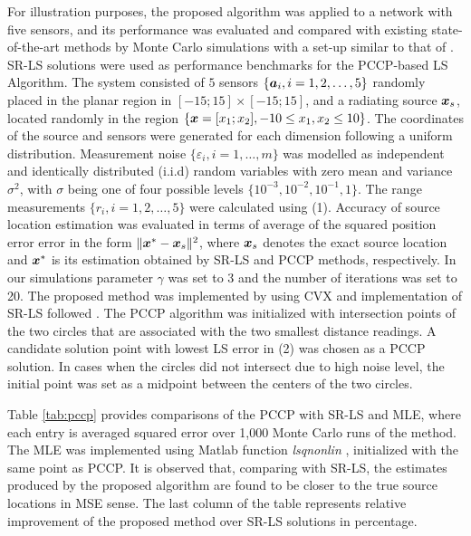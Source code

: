 For illustration purposes, the proposed algorithm was applied to a network with five sensors, and its performance was evaluated and compared with existing state-of-the-art methods by Monte Carlo simulations with a set-up similar to that of \cite{12}. SR-LS solutions were used as performance benchmarks for the PCCP-based LS Algorithm. The system consisted of $5$ sensors $\{\mbox{\boldmath$a$}_i, i = 1, 2,\ldots,5\}$ randomly placed in the planar region in $[-15;15]\times[-15;15]$, and a radiating source $\mbox{\boldmath$x$}_s$, located randomly in the region $\{\mbox{\boldmath$x$}=[x_1;x_2], -10\leq x_1,x_2\leq 10\}$. The coordinates of the source and sensors were generated for each dimension following a uniform distribution. Measurement noise $\{\varepsilon_i, i=1,\ldots,m\}$ was modelled as independent and identically distributed (i.i.d) random variables with zero mean and variance $\sigma^2$, with $\sigma$ being one of four possible levels $\{10^{-3}, 10^{-2}, 10^{-1}, 1\}$.  The range measurements $\{r_i, i=1, 2,\ldots,5\}$ were calculated using (1). Accuracy of source location estimation was evaluated in terms of average of the squared position error error in the form $\|\mbox{\boldmath$x$}^*-\mbox{\boldmath$x$}_s\|^2$, where $\mbox{\boldmath$x$}_s$ denotes the exact source location and $\mbox{\boldmath$x$}^*$ is its estimation obtained by SR-LS and PCCP methods, respectively.   In our simulations parameter $\gamma$ was set to 3 and the number of iterations was set to 20. The proposed method was implemented by using  CVX  \cite{cvx} and implementation of SR-LS followed \cite{12}. The PCCP algorithm was initialized with   intersection points of the two circles that are associated with the two smallest distance readings. A candidate solution point with lowest LS error in (2) was chosen as a PCCP solution. In  cases when the circles did not intersect due to high noise level, the initial point was set as a midpoint between the centers of the two circles.  

Table \ref{tab:pccp}  provides comparisons of the PCCP with SR-LS and MLE, where each entry is averaged squared error over 1,000 Monte Carlo runs of the method. The MLE was implemented using Matlab function \textit{lsqnonlin} \cite{matlab}, initialized with the same point as PCCP. It is observed that, comparing with SR-LS, the estimates produced by the proposed algorithm are found to be closer to the true source locations in MSE sense. The last column of the table  represents relative improvement of the proposed method over SR-LS solutions in percentage. 



